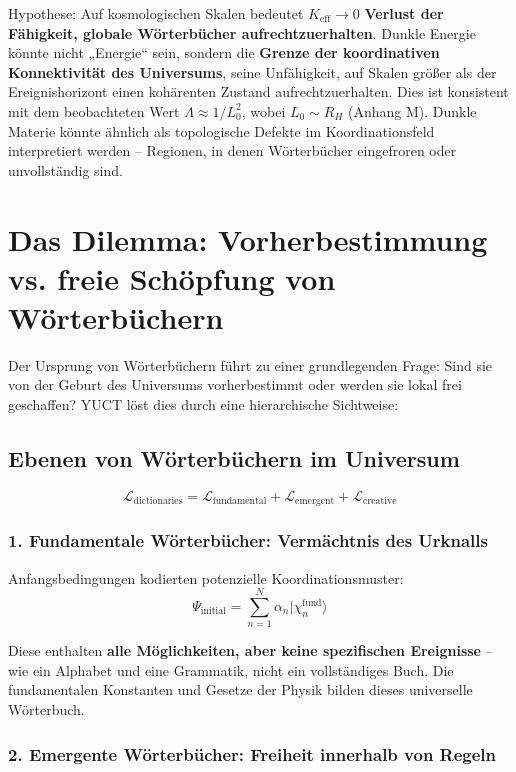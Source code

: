 \documentclass[12pt,a4paper]{article}
\newcommand{\eff}{\mathrm{eff}}
\newcommand{\Ke}{K_{\eff}}
\begin{document}
	Hypothese: Auf kosmologischen Skalen bedeutet $\Ke \to 0$ \textbf{Verlust der Fähigkeit, globale Wörterbücher aufrechtzuerhalten}. Dunkle Energie könnte nicht „Energie“ sein, sondern die \textbf{Grenze der koordinativen Konnektivität des Universums}, seine Unfähigkeit, auf Skalen größer als der Ereignishorizont einen kohärenten Zustand aufrechtzuerhalten. Dies ist konsistent mit dem beobachteten Wert $\Lambda \approx 1/L_0^2$, wobei $L_0 \sim R_H$ (Anhang M). Dunkle Materie könnte ähnlich als topologische Defekte im Koordinationsfeld interpretiert werden – Regionen, in denen Wörterbücher eingefroren oder unvollständig sind.
	
	\section{Das Dilemma: Vorherbestimmung vs. freie Schöpfung von Wörterbüchern}
	
	Der Ursprung von Wörterbüchern führt zu einer grundlegenden Frage: Sind sie von der Geburt des Universums vorherbestimmt oder werden sie lokal frei geschaffen? YUCT löst dies durch eine hierarchische Sichtweise:
	
	\subsection{Ebenen von Wörterbüchern im Universum}
	
	\[
	\mathcal{L}_{\text{dictionaries}} = \mathcal{L}_{\text{fundamental}} + \mathcal{L}_{\text{emergent}} + \mathcal{L}_{\text{creative}}
	\]
	
	\subsubsection{1. Fundamentale Wörterbücher: Vermächtnis des Urknalls}
	
	Anfangsbedingungen kodierten potenzielle Koordinationsmuster:
	\[
	\Psi_{\text{initial}} = \sum_{n=1}^N \alpha_n |\chi_n^{\text{fund}}\rangle
	\]
	
	Diese enthalten \textbf{alle Möglichkeiten, aber keine spezifischen Ereignisse} – wie ein Alphabet und eine Grammatik, nicht ein vollständiges Buch. Die fundamentalen Konstanten und Gesetze der Physik bilden dieses universelle Wörterbuch.
	
	\subsubsection{2. Emergente Wörterbücher: Freiheit innerhalb von Regeln}
	
\end{document}
